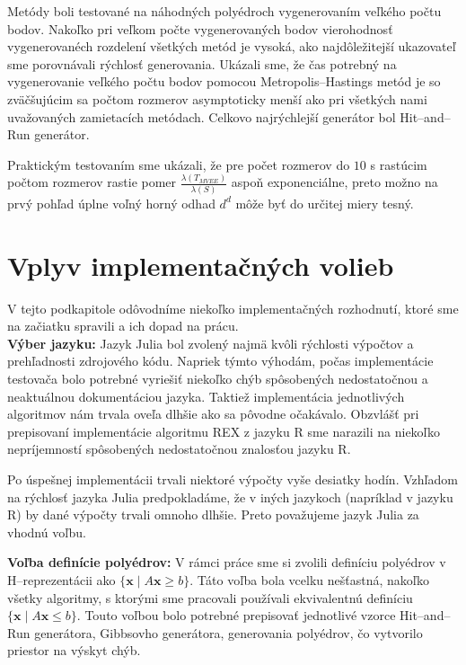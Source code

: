 Metódy boli testované na náhodných polyédroch vygenerovaním veľkého počtu bodov. Nakoľko pri veľkom počte vygenerovaných bodov vierohodnosť vygenerovanéch rozdelení všetkých metód je vysoká, ako najdôležitejší ukazovateľ sme porovnávali rýchlosť generovania.
Ukázali sme, že čas potrebný na vygenerovanie veľkého počtu bodov pomocou Metropolis--Hastings metód je so zväčšujúcim sa počtom rozmerov asymptoticky menší ako pri všetkých nami uvažovaných zamietacích metódach. Celkovo najrýchlejší generátor bol Hit--and--Run generátor.

Praktickým testovaním sme ukázali, že pre počet rozmerov do $10$ s rastúcim počtom rozmerov rastie pomer $\frac{\lambda(T_{MVEE})}{\lambda(S)}$ aspoň exponenciálne, preto možno na prvý pohľad úplne voľný horný odhad $d^d$ môže byť do určitej miery tesný.\\

\section{Vplyv implementačných volieb}

V tejto podkapitole odôvodníme niekoľko implementačných rozhodnutí, ktoré sme na začiatku spravili a ich dopad na prácu.\\

\textbf{Výber jazyku:} Jazyk Julia bol zvolený najmä kvôli rýchlosti výpočtov a prehľadnosti zdrojového kódu. Napriek týmto výhodám, počas implementácie testovača bolo potrebné vyriešiť niekoľko chýb spôsobených nedostatočnou a neaktuálnou dokumentáciou jazyka. Taktiež implementácia jednotlivých algoritmov nám trvala oveľa dlhšie ako sa pôvodne očakávalo. Obzvlášť pri prepisovaní implementácie algoritmu REX z jazyku R \cite{rex_harman} sme narazili na niekoľko nepríjemností spôsobených nedostatočnou znalosťou jazyku R.

Po úspešnej implementácii trvali niektoré výpočty vyše desiatky hodín. Vzhľadom na rýchlosť jazyka Julia predpokladáme, že v iných jazykoch (napríklad v jazyku R) by dané výpočty trvali omnoho dlhšie. Preto považujeme jazyk Julia za vhodnú voľbu.

\textbf{Voľba definície polyédrov:} V rámci práce sme si zvolili definíciu polyédrov v H--reprezentácii ako $\{ \mathbf x \; | \; A \mathbf x \geq b \}$. Táto voľba bola vcelku nešťastná, nakoľko všetky algoritmy, s ktorými sme pracovali používali ekvivalentnú definíciu $\{ \mathbf x \; | \; A \mathbf x \leq b \}$. Touto voľbou bolo potrebné prepisovať jednotlivé vzorce Hit--and--Run generátora, Gibbsovho generátora, generovania polyédrov, čo vytvorilo priestor na výskyt chýb.

